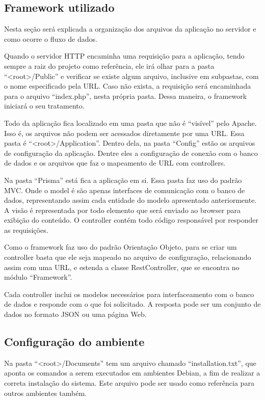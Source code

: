 \documentclass[graduacao,brazil]{ThesisPUC}
\begin{document}
\subsection{Framework utilizado}

Nesta seção será explicada a organização dos arquivos da aplicação no servidor e como ocorre o fluxo de dados.

Quando o servidor HTTP encaminha uma requisição para a aplicação, tendo sempre a raiz do projeto como referência, ele irá olhar para a pasta “<root>/Public” e verificar se existe algum arquivo, inclusive em subpastas, com o nome especificado pela URL. Caso não exista, a requisição será encaminhada para o arquivo “index.php”, nesta própria pasta. Dessa maneira, o framework iniciará o seu tratamento.

Todo da aplicação fica localizado em uma pasta que não é “visível” pelo Apache. Isso é, os arquivos não podem ser acessados diretamente por uma URL. Essa pasta é “<root>/Application”. Dentro dela, na pasta “Config” estão os arquivos de configuração da aplicação. Dentre eles a configuração de conexão com o banco de dados e os arquivos que faz o mapeamento de URL com controllers.

Na pasta “Prisma” está fica a aplicação em si. Essa pasta faz uso do padrão MVC. Onde o model é são apenas interfaces de comunicação com o banco de dados, representando assim cada entidade do modelo apresentado anteriormente. A visão é representada por todo elemento que será enviado ao browser para exibição do conteúdo. O controller contém todo código responsável por responder as requisições.

Como o framework faz uso do padrão Orientação Objeto, para se criar um controller basta que ele seja mapeado no arquivo de configuração, relacionando assim com uma URL, e estenda a classe RestController, que se encontra no módulo “Framework”.

Cada controller inclui os modelos necessários para interfaceamento com o banco de dados e responde com o que foi solicitado. A resposta pode ser um conjunto de dados no formato JSON ou uma página Web.

\subsection{Configuração do ambiente}

Na pasta “<root>/Documents” tem um arquivo chamado “installation.txt”, que aponta os comandos a serem executados em ambientes Debian, a fim de realizar a correta instalação do sistema. Este arquivo pode ser usado como referência para outros ambientes também.
\end{document}
